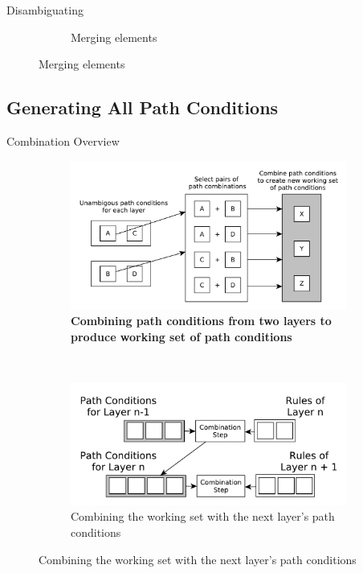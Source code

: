 \documentclass[xcolor=dvipsnames, 14pt]{beamer}
\begin{document}
\begin{frame}{Disambiguating}
\begin{figure}[htb]
\begin{subfigure}[b]{0.40\textwidth}
                \caption{Merging elements}
                \label{fig:collapse_merge_match}
        \end{subfigure}%
        \label{fig:merge_match_elements}
\end{figure}
\end{frame}

\subsection{Generating All Path Conditions}

\begin{frame}{Combination Overview}
\begin{figure}[htb]
        \centering
        \begin{subfigure}[b]{0.55\textwidth}
                \centering
                \includegraphics[width=1\textwidth]{../figures/building_path_conditions/combining_path_conditions.pdf}
                \caption{\textbf{Combining path conditions from two layers to produce working set of path conditions}}
                \label{fig:create_working_set}
        \end{subfigure}%
        ~
        \begin{subfigure}[b]{0.42\textwidth}
                \centering
                \includegraphics[width=1\textwidth]{../figures/building_path_conditions/next_layer.pdf}
                \caption{Combining the working set with the next layer's path conditions}
                \label{fig:combine_working_set}
        \end{subfigure}%
        \label{fig:combining_path_conditions}
\end{figure}
\end{frame}
\end{document}
